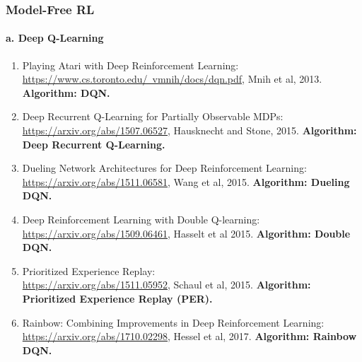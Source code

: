 \documentclass[lang=cn,11pt,a4paper]{eleganttemplate}
\begin{document}
\subsubsection{Model-Free RL} 
\paragraph{a. Deep Q-Learning}
\begin{enumerate}
    \item Playing Atari with Deep Reinforcement Learning:\\ \href{https://www.cs.toronto.edu/~vmnih/docs/dqn.pdf}{https://www.cs.toronto.edu/~vmnih/docs/dqn.pdf}, Mnih et al, 2013. \textbf{Algorithm: DQN.}
    \item Deep Recurrent Q-Learning for Partially Observable MDPs:\\ \href{https://arxiv.org/abs/1507.06527}{https://arxiv.org/abs/1507.06527}, Hausknecht and Stone, 2015. \textbf{Algorithm: Deep Recurrent Q-Learning.}
    \item Dueling Network Architectures for Deep Reinforcement Learning:\\ \href{https://arxiv.org/abs/1511.06581}{https://arxiv.org/abs/1511.06581}, Wang et al, 2015. \textbf{Algorithm: Dueling DQN.}
    \item Deep Reinforcement Learning with Double Q-learning:\\ \href{https://arxiv.org/abs/1509.06461}{https://arxiv.org/abs/1509.06461}, Hasselt et al 2015. \textbf{Algorithm: Double DQN.}
    \item Prioritized Experience Replay:\\ \href{https://arxiv.org/abs/1511.05952}{https://arxiv.org/abs/1511.05952}, Schaul et al, 2015. \textbf{Algorithm: Prioritized Experience Replay (PER).}
    \item Rainbow: Combining Improvements in Deep Reinforcement Learning:\\ \href{https://arxiv.org/abs/1710.02298}{https://arxiv.org/abs/1710.02298}, Hessel et al, 2017. \textbf{Algorithm: Rainbow DQN.}
\end{enumerate}
\end{document}
